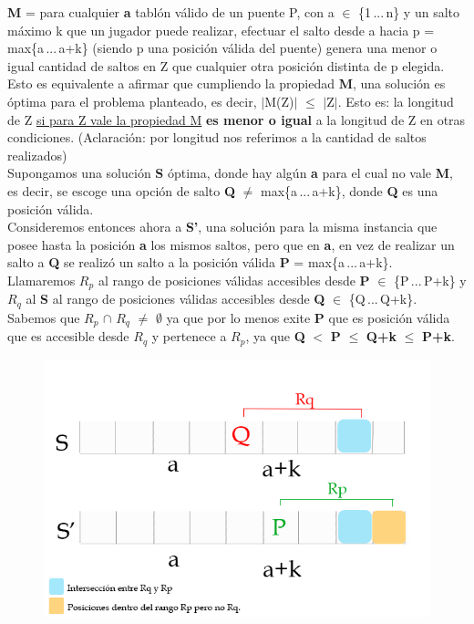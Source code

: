 \documentclass[10pt,a4paper]{article}
\begin{document}
\textbf{M} = para cualquier \textbf{a} tabl\'on v\'alido de un puente P, con a $\in$ \{1\,...\,n\} y un salto m\'aximo k que un jugador puede realizar, efectuar el salto desde a hacia p = max\{a\,...\,a+k\} (siendo p una posici\'on v\'alida del puente) genera una menor o igual cantidad de saltos en Z que cualquier otra posici\'on distinta de p elegida.\\

Esto es equivalente a afirmar que cumpliendo la propiedad \textbf{M}, una solución es \'optima para el problema planteado, es decir, $\vert$M(Z)$\vert$ $\leq$ $\vert$Z$\vert$. Esto es: la longitud de Z  \underline{si para Z vale la propiedad M} \textbf{es menor o igual} a la longitud de Z en otras condiciones. (Aclaraci\'on: por longitud nos referimos a la cantidad de saltos realizados) \\

Supongamos una solución \textbf{S} óptima, donde hay algún \textbf{a} para el cual no vale \textbf{M}, es decir, se escoge una opción de salto \textbf{Q} $\neq$ max\{a\,...\,a+k\}, donde \textbf{Q} es una posición válida.\\
Consideremos entonces ahora a \textbf{S'}, una solución para la misma instancia que posee hasta la posición \textbf{a} los mismos saltos, pero que en \textbf{a}, en vez de realizar un salto a \textbf{Q} se realizó un salto a la posición válida \textbf{P} = max\{a\,...\,a+k\}.\\
Llamaremos $R_{p}$ al rango de posiciones válidas accesibles desde \textbf{P} $\in$ \{P\,...\,P+k\} y $R_{q}$ al \textbf{S} al rango de posiciones válidas accesibles desde \textbf{Q} $\in$ \{Q\,...\,Q+k\}.\\
Sabemos que $R_{p}$ $\cap$ $R_{q}$ $\neq$ $\emptyset$ ya que por lo menos exite \textbf{P} que es posición válida que es accesible desde $R_{q}$ y pertenece a $R_{p}$, ya que \textbf{Q} $<$ \textbf{P} $\leq$ \textbf{Q+k} $\leq$ \textbf{P+k}.

	\begin{figure}[h]
		\begin{center}
		   \includegraphics[scale=0.50]{esquema.png}
		\end{center}
	\end{figure}
\end{document}

